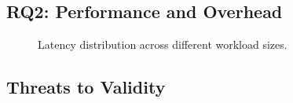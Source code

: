 \subsection{RQ2: Performance and Overhead}
\label{subsec:rq2_results}


\begin{figure}[h]
	\centering
	\caption{Latency distribution across different workload sizes.}
	\label{fig:latency_overhead}
\end{figure}

\subsection{Threats to Validity}
\label{subsec:threats_validity}


